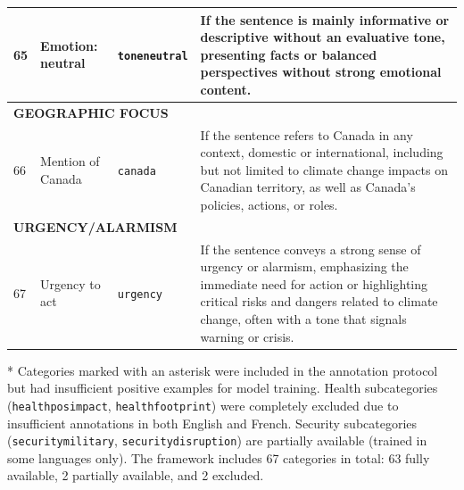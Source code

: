 \documentclass[12pt]{article}
\renewcommand\_{\texttt{\detokenize{_}\allowbreak}}
\begin{document}
{\begin{longtable}{p{0.5cm}p{4.5cm}p{2.8cm}p{13.5cm}}
65 & Emotion: neutral & \texttt{tone\_neutral} & If the sentence is mainly informative or descriptive without an evaluative tone, presenting facts or balanced perspectives without strong emotional content. \\
\midrule
\multicolumn{4}{l}{\cellcolor{gray!10}\textbf{GEOGRAPHIC FOCUS}} \\
66 & Mention of Canada & \texttt{canada} & If the sentence refers to Canada in any context, domestic or international, including but not limited to climate change impacts on Canadian territory, as well as Canada's policies, actions, or roles. \\
\midrule
\multicolumn{4}{l}{\cellcolor{gray!10}\textbf{URGENCY/ALARMISM}} \\
67 & Urgency to act & \texttt{urgency} & If the sentence conveys a strong sense of urgency or alarmism, emphasizing the immediate need for action or highlighting critical risks and dangers related to climate change, often with a tone that signals warning or crisis. \\
\bottomrule
\end{longtable}
\vspace{0.5em}
\noindent\footnotesize
* Categories marked with an asterisk were included in the annotation protocol but had insufficient positive examples for model training. Health subcategories (\texttt{health\_pos\_impact}, \texttt{health\_footprint}) were completely excluded due to insufficient annotations in both English and French. Security subcategories (\texttt{security\_military}, \texttt{security\_disruption}) are partially available (trained in some languages only). The framework includes 67 categories in total: 63 fully available, 2 partially available, and 2 excluded.
}
\endlandscape
\end{document}
